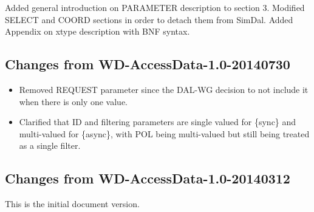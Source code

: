 \documentclass[11pt,a4paper]{ivoa}
\begin{document}
Added general introduction on PARAMETER description to
section 3. Modified SELECT and COORD sections in order to
detach them from SimDal. Added Appendix on xtype description
with BNF syntax.

\subsection{Changes from WD-AccessData-1.0-20140730}

\begin{itemize}
\item Removed REQUEST parameter since the DAL-WG decision to not
include it when there is only one value.

\item Clarified that ID and filtering parameters are single
valued for \{sync\} and multi-valued for \{async\}, with POL
being multi-valued but still being treated as a single
filter.
\end{itemize}

\subsection{Changes from WD-AccessData-1.0-20140312}

This is the initial document version.


\end{document}

